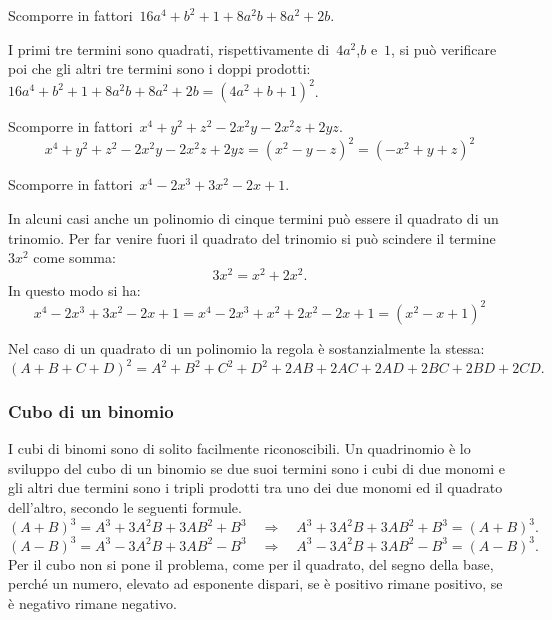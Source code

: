 \begin{exrig}
 \begin{esempio}
Scomporre in fattori~$16a^{4}+b^{2}+1+8a^{2}b+8a^{2}+2b$.

I primi tre termini sono quadrati, rispettivamente di~$4a^{2}$,$b$ e~$1$, 
si può verificare poi che gli altri tre termini sono i doppi 
prodotti:~$16a^{4}+b^{2}+1+8a^{2}b+8a^{2}+2b=\left(4a^{2}+b+1\right)^{2}$.
 \end{esempio}

 \begin{esempio}
Scomporre in fattori~$x^{4}+y^{2}+z^{2}-2x^{2}y-2x^{2}z+2yz$.
\[x^{4}+y^{2}+z^{2}-2x^{2}y-2x^{2}z+2yz=
  \left(x^{2}-y-z\right)^{2}=\left(-x^{2}+y+z\right)^{2}\]
 \end{esempio}

 \begin{esempio}
Scomporre in fattori~$x^{4}-2x^{3}+3x^{2}-2x+1$.

In alcuni casi anche un polinomio di cinque termini può essere il quadrato di 
un trinomio.
Per far venire fuori il quadrato del trinomio si può scindere il 
termine~$3x^{2}$ come somma:
\[3x^{2}=x^{2}+2x^{2}.\]
In questo modo si ha:
\[x^{4}-2x^{3}+3x^{2}-2x+1=x^{4}-2x^{3}+x^{2}+2x^{2}-2x+1=(x^{2}-x+1)^{2}\]
 \end{esempio}
\end{exrig}

Nel caso di un quadrato di un polinomio la regola è sostanzialmente la stessa:
\begin{equation*}
(A+B+C+D)^{2}=A^{2}+B^{2}+C^{2}+D^{2}+2AB+2AC+2AD+2BC+2BD+2CD.
\end{equation*}

\subsubsection{Cubo di un binomio}
\label{subsubsec:divpol_cubobin}

I cubi di binomi sono di solito facilmente riconoscibili. Un quadrinomio è lo 
sviluppo del cubo di un binomio se due suoi termini sono i cubi di due monomi 
e gli altri due termini sono i tripli prodotti tra uno dei due monomi ed il 
quadrato dell'altro, secondo le seguenti formule.
\begin{equation*}
(A+B)^{3}=A^{3}+3A^{2}B+3AB^{2}+B^{3}\quad \Rightarrow \quad 
A^{3}+3A^{2}B+3AB^{2}+B^{3}=(A+B)^{3}.
\end{equation*}
\begin{equation*}
(A-B)^{3}=A^{3}-3A^{2}B+3AB^{2}-B^{3}\quad \Rightarrow \quad 
A^{3}-3A^{2}B+3AB^{2}-B^{3}=(A-B)^{3}.
\end{equation*}
Per il cubo non si pone il problema, come per il quadrato, del segno della 
base, perché un numero, elevato ad esponente dispari, se è positivo rimane 
positivo, se è negativo rimane negativo.

